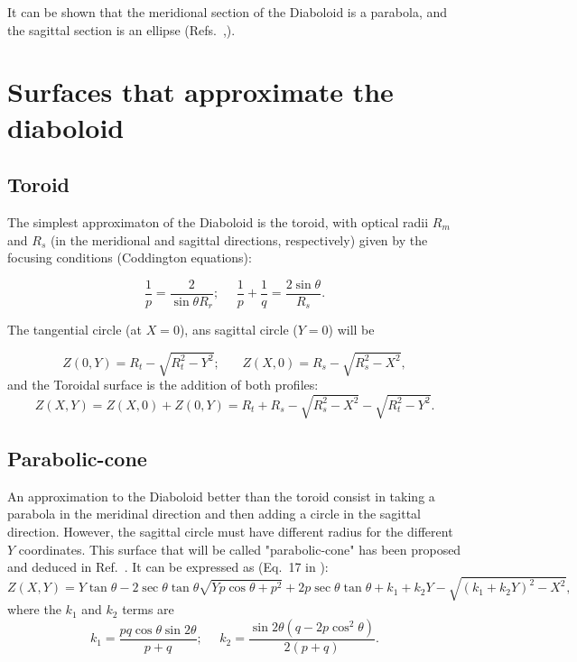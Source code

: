 \documentclass[a4paper, 11pt]{article}
\begin{document}
It can be shown that the meridional section of the Diaboloid is a parabola, and the sagittal section is an ellipse (Refs.~\cite{Goldberg2020},\cite{Valeriy2020a}).

\section{Surfaces that approximate the diaboloid}

\subsection{Toroid}
The simplest approximaton of the Diaboloid is the toroid, with optical radii $R_m$ and $R_s$ (in the meridional and sagittal directions, respectively) given by the focusing conditions (Coddington equations): 

\begin{equation}
\label{eqn:radii}
\frac{1}{p} = \frac{2 }{\sin\theta R_r};~~~~~~
\frac{1}{p} + \frac{1}{q} = \frac{2\sin\theta}{ R_s}.
\end{equation}

The tangential circle (at $X=0$), ans sagittal circle ($Y=0$) will be

\begin{equation}
\label{eqn:toroidTS}
Z(0,Y) = R_t - \sqrt{R_t^2 - Y^2};~~~~~~~~
Z(X,0) = R_s - \sqrt{R_s^2 - X^2},
\end{equation}
and the Toroidal surface is the addition of both profiles: 
\begin{equation}
\label{eqn:toroid}
Z(X,Y) = Z(X,0) + Z(0,Y) = 
R_t + R_s - \sqrt{R_s^2 - X^2}
- \sqrt{R_t^2 - Y^2}.
\end{equation}

\subsection{Parabolic-cone}
An approximation to the Diaboloid better than the toroid consist in taking a parabola in the meridinal direction and then adding a circle in the sagittal direction. However, the sagittal circle must have different radius for the different $Y$ coordinates. This surface that will be called "parabolic-cone" has been proposed and deduced in Ref.~\cite{Valeriy2020c}. It can be expressed as (Eq.~17 in \cite{Valeriy2020c}):
\begin{equation}
\label{eqn:parabolicCone}
Z(X,Y) = Y \tan\theta - 2 \sec\theta \tan\theta
\sqrt{Y p \cos\theta + p^2} + 2 p \sec\theta \tan\theta +
k_1 + k_2 Y - \sqrt{(k_1 + k_2 Y)^2 - X^2},
\end{equation}
where the $k_1$ and $k_2$ terms are
\begin{equation}
k_1 = \frac{p q \cos\theta \sin2\theta}{p+q};~~~~~~
k_2 = \frac{\sin2\theta(q-2p\cos^2\theta)}{2(p+q)}.
\end{equation}
\end{document}
